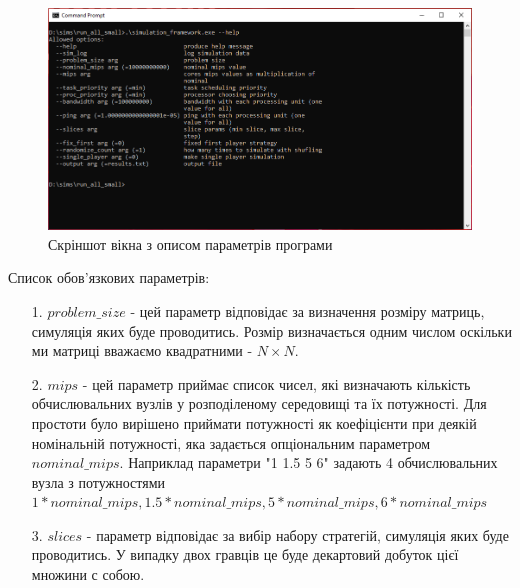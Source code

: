 \begin{figure}[H]
	\centering
	\includegraphics[width=\textwidth]{practice/img/help_ilustration}
	\caption{Скріншот вікна з описом параметрів програми}
	\label{fig:help_ilustration}
\end{figure}

Список обов'язкових параметрів:
\begin{itemize}
	\item[1.] $problem\_size$ - цей параметр відповідає за визначення розміру матриць, симуляція яких буде проводитись. Розмір визначається одним числом оскільки ми матриці вважаємо квадратними - $N \times N$.
	\item[2.] $mips$ - цей параметр приймає список чисел, які визначають кількість обчислювальних вузлів у розподіленому середовищі та їх потужності. Для простоти було вирішено приймати потужності як коефіцієнти при деякій номінальній потужності, яка задається опціональним параметром $nominal\_mips$. Наприклад параметри "1 1.5 5 6" задають 4 обчислювальних вузла з потужностями $1*nominal\_mips, 1.5*nominal\_mips, 5*nominal\_mips, 6*nominal\_mips$
	\item[3.] $slices$ - параметр відповідає за вибір набору стратегій, симуляція яких буде проводитись. У випадку двох гравців це буде декартовий добуток цієї множини с собою.
\end{itemize}

